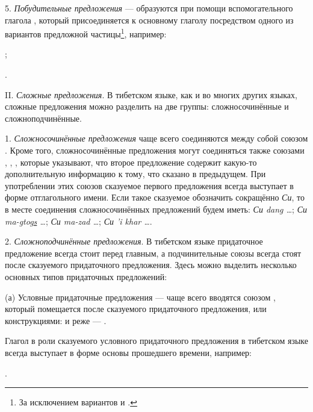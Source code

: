 5. \emph{Побудительные предложения} --- образуются при помощи вспомогательного глагола , который присоединяется к основному глаголу посредством одного из вариантов предложной частицы\footnote[53]{За исключением вариантов  и .}, например:
\begin{prfsample}
	\item {};
	\item {}.
\end{prfsample}

II. \emph{Сложные предложения}. В тибетском языке, как и во многих других языках, сложные предложения можно разделить на две группы: сложносочинённые и сложноподчинённые.

1. \emph{Сложносочинённые предложения} чаще всего соединяются между собой союзом . Кроме того, сложносочинённые предложения могут соединяться также союзами , , , которые указывают, что второе предложение содержит какую-то дополнительную информацию к тому, что сказано в предыдущем. При употреблении этих союзов сказуемое первого предложения всегда выступает в форме отглагольного имени. Если такое сказуемое обозначить сокращённо \emph{Си}, то в месте соединения сложносочинённых предложений будем иметь: \emph{Си dang \ldots{}}; \emph{Си ma-\ul{g}tog\ul{s} \ldots{}}; \emph{Си ma-zad \ldots{}}; \emph{Си 'i khar \ldots{}}.

2. \emph{Сложноподчинённые предложения}. В тибетском языке придаточное предложение всегда стоит перед главным, а подчинительные союзы всегда стоят после сказуемого придаточного предложения. Здесь можно выделить несколько основных типов придаточных предложений:

(а)	Условные придаточные предложения --- чаще всего вводятся союзом , который помещается после сказуемого придаточного предложения, или конструкциями:
 и реже --- .

Глагол в роли сказуемого условного придаточного предложения в тибетском языке всегда выступает в форме основы прошедшего времени, например:
\begin{prfsample}
	\item {}.
\end{prfsample}

